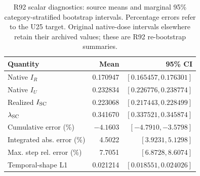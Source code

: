 \begin{table}[!t]
\centering\small
\caption{R92 scalar diagnostics: source means and marginal 95\% category-stratified bootstrap intervals. Percentage errors refer to the U25 target. Original native-dose intervals elsewhere retain their archived values; these are R92 re-bootstrap summaries.}
\label{tab:r92-diagnostics}
\begin{tabular}{lrr}
\toprule
Quantity & Mean & 95\% CI\\
\midrule
Native $I_R$ & 0.170947 & $[0.165457,0.176301]$\\
Native $I_U$ & 0.232834 & $[0.226776,0.238774]$\\
Realized $I_{\rm SC}$ & 0.223068 & $[0.217443,0.228499]$\\
$\lambda_{\rm SC}$ & 0.341670 & $[0.337521,0.345874]$\\
Cumulative error (\%) & $-4.1603$ & $[-4.7910,-3.5798]$\\
Integrated abs. error (\%) & 4.5022 & $[3.9231,5.1298]$\\
Max. step rel. error (\%) & 7.7051 & $[6.8728,8.6074]$\\
Temporal-shape L1 & 0.021214 & $[0.018551,0.024026]$\\
\bottomrule
\end{tabular}
\end{table}

